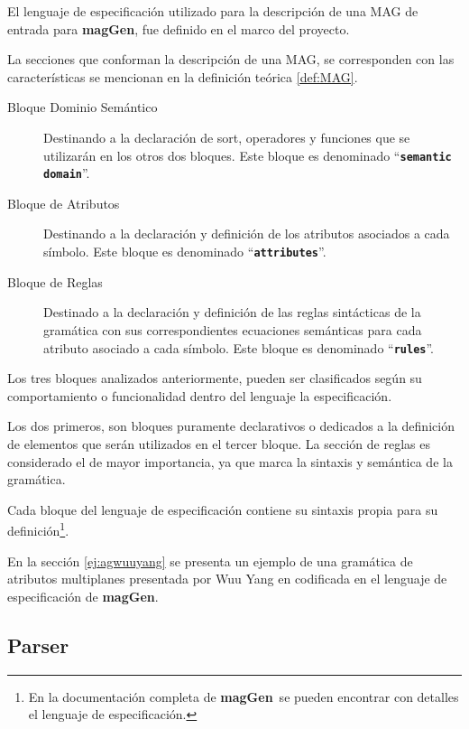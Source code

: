 \documentclass[runningheads,a4paper]{llncs}
\newcommand{\textbtt}[1]{\texttt{\textbf{#1}}}
\newcommand{\maggen}{\textbf{magGen}}
\begin{document}
El lenguaje de especificación utilizado para la descripción de una MAG de entrada para \maggen, fue definido en el marco del proyecto.
 
La secciones que conforman la descripción de una MAG, se corresponden con las características se mencionan en la definición teórica \ref{def:MAG}.
 

\begin{description}
\item [Bloque Dominio Semántico] Destinando a la declaración de sort, operadores y funciones que se utilizarán en los otros dos bloques. Este bloque es denominado ``\textbtt{semantic domain}''.

\item [Bloque de Atributos] Destinando a la declaración y definición de los atributos asociados a cada símbolo. Este bloque es denominado ``\textbtt{attributes}''.

\item [Bloque de Reglas] Destinado a la declaración y definición de las reglas sintácticas de la gramática con sus correspondientes ecuaciones semánticas para cada atributo asociado a cada símbolo. Este bloque es denominado ``\textbtt{rules}''.
\end{description}

Los tres bloques analizados anteriormente, pueden ser clasificados según su comportamiento o funcionalidad dentro del lenguaje la especificación.

Los dos primeros, son bloques puramente declarativos o dedicados a la definición de elementos que serán utilizados en el tercer bloque. La sección de reglas es considerado el de mayor importancia, ya que marca la sintaxis y semántica de la gramática.

Cada bloque del lenguaje de especificación contiene su sintaxis propia para su definición\footnote{En la documentación completa de \maggen\ se pueden encontrar con detalles el lenguaje de especificación.}.

En la sección \ref{ej:agwuuyang} se presenta un ejemplo de una gramática de atributos multiplanes presentada por Wuu Yang en \cite{wuu-yang1} codificada en el lenguaje de especificación de \maggen.

\subsection{Parser}
\end{document}
